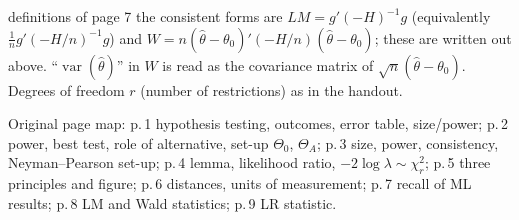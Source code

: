 \documentclass[11pt]{article}
\begin{document}
\begin{transcriptnotes}
       definitions of page 7 the consistent forms are $LM=g'(-H)^{-1}g$ (equivalently
       $\frac1n g'(-H/n)^{-1}g$) and $W=n(\hat\theta-\theta_{0})'(-H/n)(\hat\theta-\theta_{0})$; these are
       written out above. ``$\operatorname{var}(\hat\theta)$'' in $W$ is read as the covariance matrix of
       $\sqrt n(\hat\theta-\theta_{0})$. Degrees of freedom $r$ (number of restrictions) as in the handout.
 \item Original page map: p.\,1 hypothesis testing, outcomes, error table, size/power; p.\,2 power, best
       test, role of alternative, set-up $\Theta_{0}$, $\Theta_{A}$; p.\,3 size, power, consistency,
       Neyman--Pearson set-up; p.\,4 lemma, likelihood ratio, $-2\log\lambda\sim\chi^{2}_{r}$; p.\,5 three
       principles and figure; p.\,6 distances, units of measurement; p.\,7 recall of ML results;
       p.\,8 LM and Wald statistics; p.\,9 LR statistic.
\end{transcriptnotes}
\end{document}
